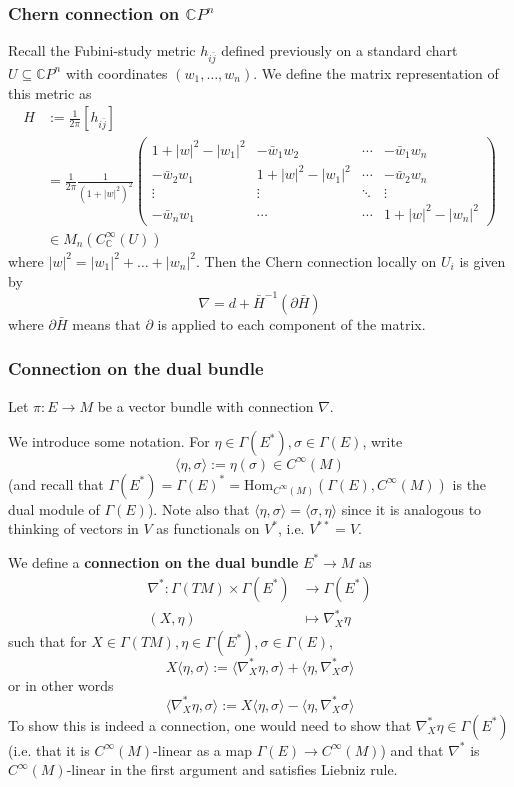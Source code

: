 \documentclass[a4paper]{article}
\theoremstyle{definition} \newtheorem*{definition}{Definition}
\theoremstyle{definition} \newtheorem*{definitions}{Definitions}
\theoremstyle{plain} \newtheorem{theorem}{Theorem}[section]
\theoremstyle{plain} \newtheorem{proposition}[theorem]{Proposition}
\theoremstyle{plain} \newtheorem{corollary}[theorem]{Corollary}
\theoremstyle{plain} \newtheorem{lemma}[theorem]{Lemma}
\theoremstyle{plain} \newtheorem{example}[theorem]{Example}
\newcommand{\defn}[1]{\textbf{#1}}
\newcommand{\complexnos}{\mathbb{C}}
\newcommand{\Hom}{\text{Hom}}
\newcommand{\smooth}{C^\infty}
\begin{document}
\subsubsection{Chern connection on $\complexnos P^n$}

Recall the Fubini-study metric $h_{i\bar{j}}$ defined previously on a standard chart $U\subseteq \complexnos P^n$ with coordinates $(w_1, \dots, w_n)$. We define the matrix representation of this metric as
\begin{align*}
H & := \frac{1}{2\pi} \left[  h_{i\bar{j}} \right] \\
& = \frac{1}{2\pi} \frac{1}{(1+|w|^2)^2}\begin{pmatrix}
1+|w|^2-|w_1|^2 & -\bar{w}_1w_2 & \cdots & -\bar{w}_1w_n \\
-\bar{w}_2w_1 & 1+|w|^2-|w_1|^2 & \cdots & -\bar{w}_2w_n \\
\vdots & \vdots & \ddots & \vdots \\
-\bar{w}_nw_1 & \cdots & \cdots & 1+|w|^2-|w_n|^2
\end{pmatrix} \\
& \in M_n(\smooth_\complexnos (U))
\end{align*}
where $|w|^2 = |w_1|^2 + \ldots + |w_n|^2$. 
Then the Chern connection locally on $U_i$ is given by 
$$\nabla = d + \bar{H}^{-1}(\partial \bar{H})$$
where $\partial \bar{H}$ means that $\partial$ is applied to each component of the matrix. 

\subsubsection{Connection on the dual bundle}
Let $\pi:E\to M$ be a vector bundle with connection $\nabla$.

We introduce some notation. For $\eta\in \Gamma(E^*), \sigma\in \Gamma(E)$, write
$$\langle \eta, \sigma \rangle := \eta(\sigma)\in \smooth (M)$$
(and recall that $\Gamma(E^*)=\Gamma(E)^* = \Hom_{\smooth(M)}(\Gamma(E), \smooth(M))$ is the dual module of $\Gamma(E)$). Note also that $\langle \eta, \sigma \rangle = \langle \sigma, \eta \rangle $ since it is analogous to thinking of vectors in $V$ as functionals on $V^*$, i.e. $V^{**}=V$.

We define a \defn{connection on the dual bundle} $E^*\to M$ as 
\begin{align*}
    \nabla^* :  \Gamma(TM)\times \Gamma(E^*) & \to \Gamma(E^*) \\
    (X, \eta) & \mapsto \nabla^*_X \eta
\end{align*}
such that for $X\in \Gamma(TM), \eta\in \Gamma(E^*), \sigma\in \Gamma(E)$,
$$X \langle \eta, \sigma \rangle := \langle \nabla^*_X \eta , \sigma \rangle + \langle \eta, \nabla^*_X \sigma \rangle$$
or in other words
$$ \langle \nabla^*_X \eta , \sigma \rangle := X \langle \eta, \sigma \rangle - \langle \eta, \nabla^*_X \sigma \rangle$$
To show this is indeed a connection, one would need to show that $\nabla^*_X \eta \in \Gamma(E^*)$ (i.e. that it is $\smooth(M)$-linear as a map $\Gamma(E)\to \smooth(M)$) and that $\nabla^*$ is $\smooth(M)$-linear in the first argument and satisfies Liebniz rule. 
\end{document}
